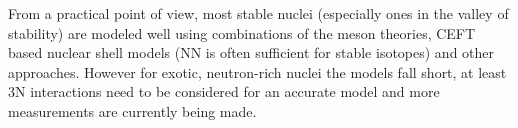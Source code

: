 From a practical point of view, most stable nuclei (especially ones in the valley of stability) are modeled well using combinations of the meson theories, CEFT based nuclear shell models (NN is often sufficient for stable isotopes) and other approaches.
However for exotic, neutron-rich nuclei the models fall short, at least 3N interactions need to be considered \cite{wienholtz_masses_2013} for an accurate model and more measurements are currently being made.






